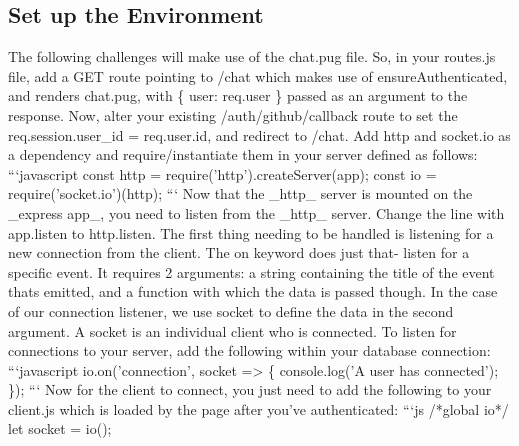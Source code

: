 \documentclass{article}%
\begin{document}
\subsection{Set up the Environment}%
\label{subsec:SetuptheEnvironment}%
The following challenges will make use of the chat.pug file. So, in your routes.js file, add a GET route pointing to /chat which makes use of ensureAuthenticated, and renders chat.pug, with \{ user: req.user \} passed as an argument to the response. Now, alter your existing /auth/github/callback route to set the req.session.user\_id = req.user.id, and redirect to /chat.\newline%
Add http and socket.io as a dependency and require/instantiate them in your server defined as follows:\newline%
```javascript\newline%
const http = require('http').createServer(app);\newline%
const io = require('socket.io')(http);\newline%
```\newline%
Now that the \_http\_ server is mounted on the \_express app\_, you need to listen from the \_http\_ server. Change the line with app.listen to http.listen.\newline%
The first thing needing to be handled is listening for a new connection from the client. The on keyword does just that{-} listen for a specific event. It requires 2 arguments: a string containing the title of the event thats emitted, and a function with which the data is passed though. In the case of our connection listener, we use socket to define the data in the second argument. A socket is an individual client who is connected.\newline%
To listen for connections to your server, add the following within your database connection:\newline%
```javascript\newline%
io.on('connection', socket => \{\newline%
  console.log('A user has connected');\newline%
\});\newline%
```\newline%
Now for the client to connect, you just need to add the following to your client.js which is loaded by the page after you've authenticated:\newline%
```js\newline%
/*global io*/\newline%
let socket = io();\newline%
\end{document}
